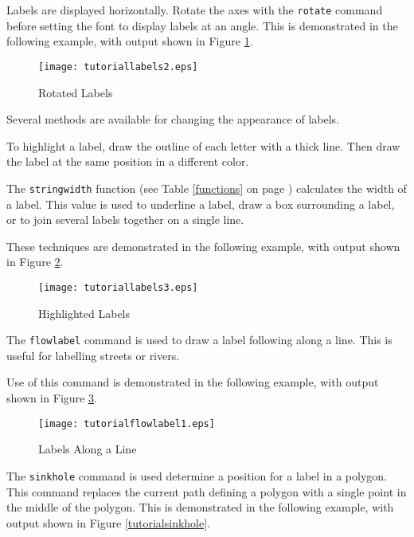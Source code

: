 Labels are displayed horizontally.  Rotate the axes with the \texttt{rotate}
command before setting the font to display labels at an angle.
This is demonstrated in the following example,
with output shown in Figure \ref{tutoriallabels2}.



\begin{figure}[htb]
\texttt{[image: tutoriallabels2.eps]}
\caption{Rotated Labels}
\label{tutoriallabels2}
\end{figure}

Several methods are available for changing the appearance of labels.

To highlight a label, draw the outline of each letter with a thick line.
Then draw the label at the same position in a different color.

The \texttt{stringwidth} function (see Table \ref{functions}
on page \pageref{functions}) calculates the
width of a label.  This value is used to underline a label, draw a box
surrounding a label, or to join several labels together on a single line.

These techniques are demonstrated in the following example,
with output shown in Figure \ref{tutoriallabels3}.



\begin{figure}[htb]
\texttt{[image: tutoriallabels3.eps]}
\caption{Highlighted Labels}
\label{tutoriallabels3}
\end{figure}

The \texttt{flowlabel} command is used to draw a label
following along a line.  This is useful for labelling streets or
rivers.

Use of this command is demonstrated in the following example,
with output shown in Figure \ref{tutoriallabels4}.



\begin{figure}[htb]
\texttt{[image: tutorialflowlabel1.eps]}
\caption{Labels Along a Line}
\label{tutoriallabels4}
\end{figure}

The \texttt{sinkhole} command is used determine a position
for a label in a polygon.  This command
replaces the current path defining a polygon with a single point in
the middle of the polygon.  This is demonstrated in the following
example, with output shown in Figure \ref{tutorialsinkhole}.

